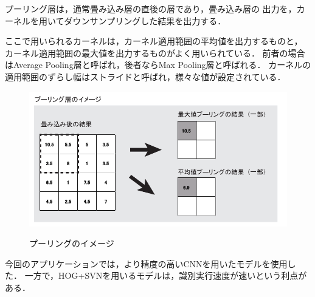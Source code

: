 プーリング層は，通常畳み込み層の直後の層であり，畳み込み層の
出力を，カーネルを用いてダウンサンプリングした結果を出力する．

ここで用いられるカーネルは，カーネル適用範囲の平均値を出力するものと，
カーネル適用範囲の最大値を出力するものがよく用いられている．
前者の場合はAverage Pooling層と呼ばれ，後者ならMax Pooling層と呼ばれる．
カーネルの適用範囲のずらし幅はストライドと呼ばれ，様々な値が設定されている．

\begin{figure}[tp]
  \centering
  \includegraphics[scale=0.7]{fig/pooling.png}
  \caption{プーリングのイメージ} \cite{14}
\end{figure}

今回のアプリケーションでは，より精度の高いCNNを用いたモデルを使用した．
一方で，HOG+SVNを用いるモデルは，識別実行速度が速いという利点がある．





